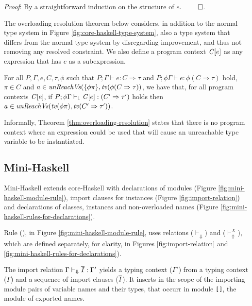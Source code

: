 {\em Proof\/}: By a straightforward induction on the structure of $e$. $\qed$.

The overloading resolution theorem below considers, in addition to the
normal type system in Figure \ref{fig:core-haskell-type-system}, also
a type system that differs from the normal type system by disregarding
improvement, and thus not removing any resolved constraint. We also
define a program context $\mathit{C\/}[e]$ as any expression that has $e$ as a
subexpression.

\begin{Theorem}
  For all $P, \Gamma, e, C, \tau, \phi$ such that
  $P;\Gamma \vdash e: C\Rightarrow \tau$ and 
  $P;\phi\Gamma \vdash e: \phi(C\Rightarrow \tau)$ hold, 
  $\pi\in C$ and
  $a\in\text{\it unReachVs\/}(\{\phi\pi\},{\it tv\/}(\phi(C\Rightarrow \tau))$,
  we have that, for all program contexts $\mathit{C\/}[e]$, 
  if $P;\phi\Gamma \vdash_1 \mathit{C\/}[e]: (C'\Rightarrow \tau')$ holds
  then $a\in \text{\it unReachVs\/}({\it tv\/}(\phi\pi),{\it tv\/}(C'\Rightarrow \tau'))$.  
\label{thm:overloading-resolution}
\end{Theorem}

Informally, Theorem \ref{thm:overloading-resolution} states that there
is no program context where an expression could be used that will
cause an unreachable type variable to be instantiated.

\subsection{Mini-Haskell}
\label{sec:mini-Haskell}

Mini-Haskell extends core-Haskell with declarations of modules (Figure
\ref{fig:mini-haskell-module-rule}), import clauses for instances
(Figure \ref{fig:import-relation}) and declarations of classes,
instances and non-overloaded names (Figure
\ref{fig:mini-haskell-rules-for-declarations}).

Rule (\MODULE), in Figure \ref{fig:mini-haskell-module-rule}, uses
relations ($\vdash_{\Downarrow}$) and ($\vdash_{\Uparrow}^X$), which
are defined separately, for clarity, in Figures
\ref{fig:import-relation} and
\ref{fig:mini-haskell-rules-for-declarations}).

The import relation $\Gamma \vdash_{\Downarrow} \overline{I} :
\Gamma'$ yields a typing context ($\Gamma'$) from a typing context
($\Gamma$) and a sequence of import clauses ($\overline{I}$).
It inserts in the scope of the importing module pairs of variable
names and their types, that occurr in module {\tt []}, the module of
exported names. 

